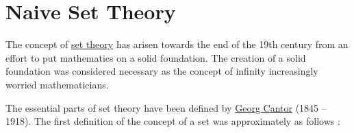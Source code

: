 \chapter{Naive Set Theory}
The concept of \href{https://en.wikipedia.org/wiki/set_theory}{set theory} has arisen towards the end of the 19th century
from an effort to put mathematics on a solid foundation.  The creation of a solid foundation was considered necessary as
the concept of infinity increasingly worried mathematicians. 

The essential parts of set theory have been defined by \href{https://de.wikipedia.org/wiki/Georg_Cantor}{Georg
  Cantor} (1845 -- 1918). The first definition of the concept of a set was approximately as follows
\cite{cantor:1895}: 

\begin{center}
\colorbox{red}{}
\end{center}
\vspace*{0.2cm}

